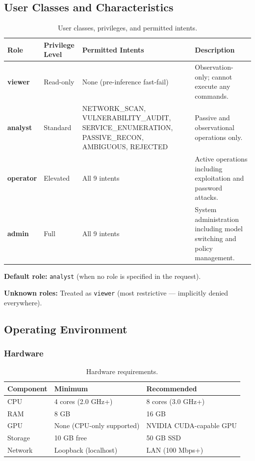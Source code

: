 ﻿\documentclass[10pt,journal,onecolumn]{IEEEtran}
\begin{document}
\subsection{User Classes and Characteristics}
\begin{table}[t]
\caption{User classes, privileges, and permitted intents.}
\label{tab:roles}
\begin{tabularx}{\textwidth}{l l X l}
\toprule
\textbf{Role} & \textbf{Privilege Level} & \textbf{Permitted Intents} & \textbf{Description}\\
\midrule
\textbf{viewer} & Read-only & None (pre-inference fast-fail) & Observation-only; cannot execute any commands.\\
\textbf{analyst} & Standard & NETWORK\_SCAN, VULNERABILITY\_AUDIT, SERVICE\_ENUMERATION, PASSIVE\_RECON, AMBIGUOUS, REJECTED & Passive and observational operations only.\\
\textbf{operator} & Elevated & All 9 intents & Active operations including exploitation and password attacks.\\
\textbf{admin} & Full & All 9 intents & System administration including model switching and policy management.\\
\bottomrule
\end{tabularx}
\end{table}

\textbf{Default role:} \texttt{analyst} (when no role is specified in the request).

\textbf{Unknown roles:} Treated as \texttt{viewer} (most restrictive --- implicitly denied everywhere).

\subsection{Operating Environment}

\subsubsection{Hardware}
\begin{table}[h]
\caption{Hardware requirements.}
\label{tab:hardware}
\begin{tabularx}{\columnwidth}{l X X}
\toprule
\textbf{Component} & \textbf{Minimum} & \textbf{Recommended}\\
\midrule
CPU & 4 cores (2.0 GHz+) & 8 cores (3.0 GHz+)\\
RAM & 8 GB & 16 GB\\
GPU & None (CPU-only supported) & NVIDIA CUDA-capable GPU\\
Storage & 10 GB free & 50 GB SSD\\
Network & Loopback (localhost) & LAN (100 Mbps+)\\
\bottomrule
\end{tabularx}
\end{table}
\end{document}
